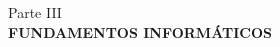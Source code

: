 \thispagestyle{empty}
\vspace*{\fill}
\begin{center}
    \large Parte III \\
    \vspace{0.5cm}           
    \LARGE \textbf{FUNDAMENTOS INFORMÁTICOS}
\end{center}
\vspace*{\fill}
\newpage
\setcounter{page}{1}  
